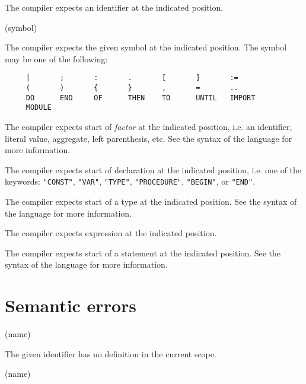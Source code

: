 
The compiler expects an identifier at the indicated position.

(symbol)

The compiler expects the given symbol at the indicated position. The symbol may
be one of the following:

\begin{verbatim}
     |       ;       :       .       [       ]       :=
     (       )       {       }       ,       =       ..
     DO      END     OF      THEN    TO      UNTIL   IMPORT
     MODULE
\end{verbatim}


The compiler expects start of {\em factor} at the indicated position, i.e.
an identifier, literal value, aggregate, left parenthesis, etc.
See the syntax of the language for more information.


The compiler expects start of declaration at the indicated position, i.e.
one of the keywords: \verb'"CONST"', \verb'"VAR"', \verb'"TYPE"',
\verb'"PROCEDURE"', \verb'"BEGIN"', or \verb'"END"'.


The compiler expects start of a type at the indicated position.
See the syntax of the language for more information.


The compiler expects expression at the indicated position.


The compiler expects start of a statement at the indicated position.
See the syntax of the language for more information.


\section{Semantic errors}

(name)

The given identifier has no definition in the current scope.

(name)

